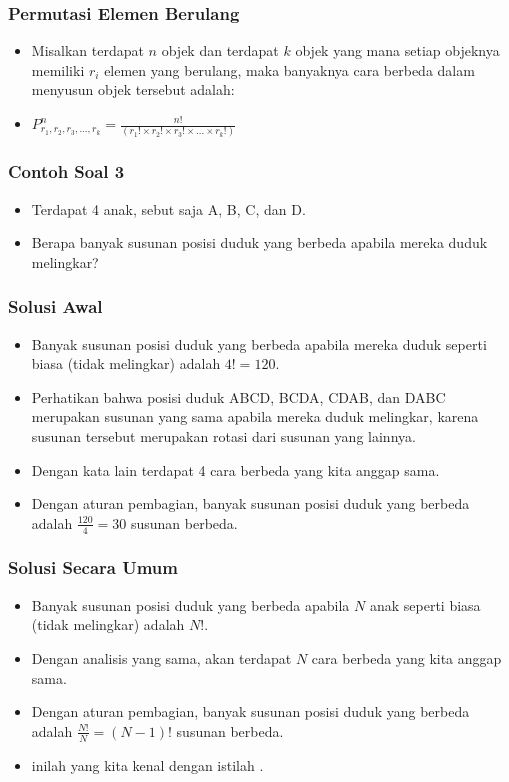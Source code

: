 \begin{frame}
\frametitle{Permutasi Elemen Berulang}
\begin{itemize}
  \item Misalkan terdapat $n$ objek dan terdapat $k$ objek yang mana setiap objeknya memiliki $r_{i}$ elemen yang berulang, maka banyaknya cara berbeda dalam menyusun objek tersebut adalah:
  \item $P^{n}_{r_{1},r_{2},r_{3},...,r_{k}} = \frac{n!}{(r_{1}! \times r_{2}! \times r_{3}! \times ... \times r_{k}!)}$ 
\end{itemize}
\end{frame}

\begin{frame}
\frametitle{Contoh Soal 3}
\begin{itemize}
  \item Terdapat 4 anak, sebut saja A, B, C, dan D.
  \item Berapa banyak susunan posisi duduk yang berbeda apabila mereka duduk melingkar?
\end{itemize}
\end{frame}

\begin{frame}
\frametitle{Solusi Awal}
\begin{itemize}
  \item Banyak susunan posisi duduk yang berbeda apabila mereka duduk seperti biasa (tidak melingkar) adalah $4! = 120$.
  \item Perhatikan bahwa posisi duduk ABCD, BCDA, CDAB, dan DABC merupakan susunan yang sama apabila mereka duduk melingkar, karena susunan tersebut merupakan rotasi dari susunan yang lainnya.
  \item Dengan kata lain terdapat 4 cara berbeda yang kita anggap sama.
  \item Dengan aturan pembagian, banyak susunan posisi duduk yang berbeda adalah $\frac{120}{4} = 30$ susunan berbeda.
\end{itemize}
\end{frame}


\begin{frame}
\frametitle{Solusi Secara Umum}
\begin{itemize}
  \item Banyak susunan posisi duduk yang berbeda apabila $N$ anak seperti biasa (tidak melingkar) adalah $N!$.
  \item Dengan analisis yang sama, akan terdapat $N$ cara berbeda yang kita anggap sama.
  \item Dengan aturan pembagian, banyak susunan posisi duduk yang berbeda adalah $\frac{N!}{N} = (N-1)!$ susunan berbeda.
  \item inilah yang kita kenal dengan istilah .
\end{itemize}
\end{frame}

